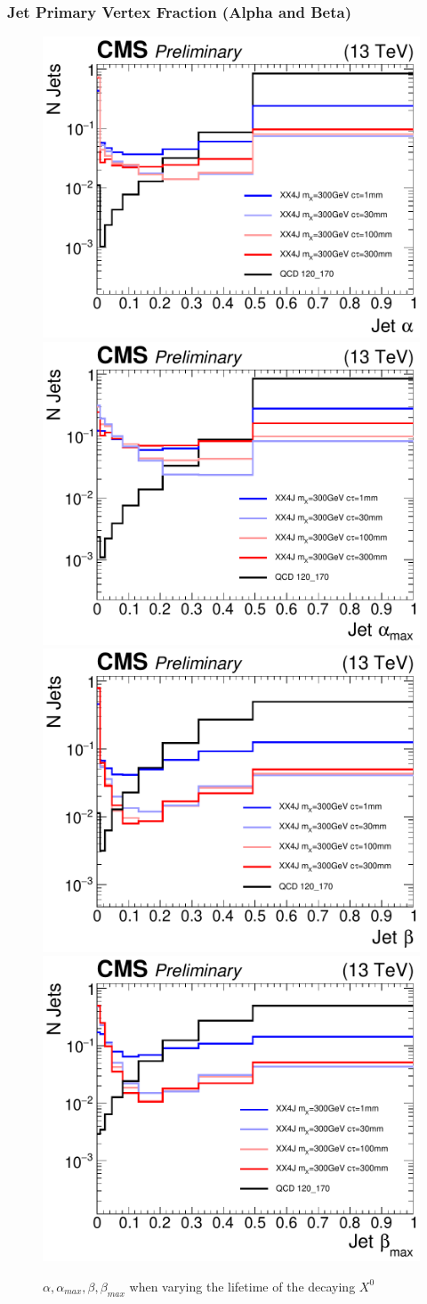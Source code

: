 \subsubsection{Jet Primary Vertex Fraction (Alpha and Beta)}

\begin{figure}
\begin{center}
\includegraphics[width=.45\textwidth]{figures/an_jetid/VTX_MATCH_IP/XX4J_alpha}
\includegraphics[width=.45\textwidth]{figures/an_jetid/VTX_MATCH_IP/XX4J_alphaMax}
\includegraphics[width=.45\textwidth]{figures/an_jetid/VTX_MATCH_IP/XX4J_beta}
\includegraphics[width=.45\textwidth]{figures/an_jetid/VTX_MATCH_IP/XX4J_betaMax}
\end{center}
\caption{$\alpha, \alpha_{max}, \beta, \beta_{max}$ when varying the lifetime of the decaying $X^0$}
\label{fig:xx4j_alpha_beta}
\end{figure}

